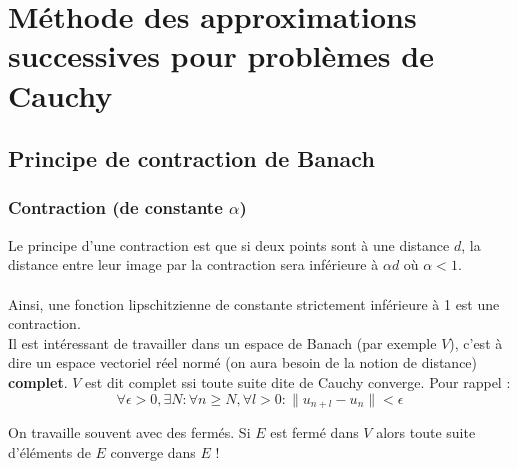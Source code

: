 \chapter{Méthode des approximations successives pour problèmes de Cauchy}

\setcounter{section}{3}
\section{Principe de contraction de Banach}
\subsection{Contraction (de constante $\alpha$)}
Le principe d'une contraction est que si deux points sont à une 
distance $d$, la distance entre leur image par la contraction 
sera inférieure à $\alpha d$ où $\alpha<1$.\\
	 	 
\ \\
Ainsi, une fonction lipschitzienne de constante strictement inférieure à
1 est une contraction.\\
	 
Il est intéressant de travailler dans un espace de Banach (par exemple $V$), 
c'est à dire un espace vectoriel réel normé (on aura besoin de la notion de 
distance) \textbf{complet}. $V$ est dit complet ssi toute suite dite de Cauchy 
converge. Pour rappel :
\begin{equation}
	\forall \epsilon> 0, \exists N : \forall n \geq N, \forall l > 0 : \| 
	u_{n+l}-u_n\| < \epsilon
\end{equation}
	
On travaille souvent avec des fermés. Si $E$ est fermé dans $V$ alors 
toute suite d’éléments de $E$ converge dans $E$ !
	
